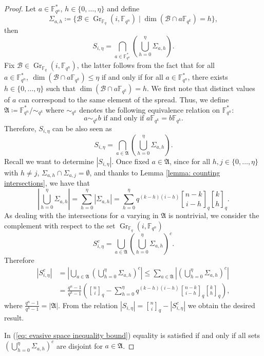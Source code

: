 \documentclass{article}
\newcommand{\Fq}{\mathbb{F}_{q}}
\newcommand{\Fqn}{\mathbb{F}_{q^n}}
\newcommand{\Fqk}{\mathbb{F}_{q^k}}
\newcommand{\calB}{\mathcal{B}}
\newcommand{\gbinom}[2]{\genfrac{[}{]}{0pt}{}{#1}{#2}}
\DeclareMathOperator{\Gr}{Gr}
\begin{document}
    \begin{proof}
        Let $a\in\Fqn^*$, $h\in\{0,\ldots,\eta\}$ and define 
    \[
    \Sigma_{a,h}\coloneqq \{\calB \in  \Gr_{\Fq}(i,\Fqn) \mid \dim(\calB \cap a \Fqk)=h\}, 
    \]
    then
    \[
    S_{i,\eta}=\bigcap_{a\in\Fqn^*}\left(\bigcup_{h=0}^\eta\Sigma_{a,h}\right).
    \]
    Fix $\calB \in  \Gr_{\Fq}(i,\Fqn)$, the latter follows from the fact that for all $a \in \Fqn^*,~\dim(\calB \cap a \Fqk) \leq \eta$ if and only if for all $a \in \Fqn^*$, there exists $h\in\{0,\ldots,\eta\}$ such that $\dim(\calB \cap a \Fqk)=h$. We first note that distinct values of $a$ can correspond to the same element of the spread. Thus, we define $\mathfrak{A}\coloneqq\Fqn^*/\sim_{q^k}$ where $\sim_{q^k}$ denotes the following equivalence relation on $\Fqn^*$: 
    \[
    a\sim_{q^k} b\text{ if and only if }a\Fqk=b\Fqk.
    \]
    Therefore, $S_{i,\eta}$ can be also seen as
    \[
    S_{i,\eta}=\bigcap_{a\in\mathfrak{A}}\left(\bigcup_{h=0}^\eta\Sigma_{a,h}\right).
    \]
    Recall we want to determine $|S_{i,\eta}|$. Once fixed $a\in\mathfrak{A}$, since for all $h,j\in\{0,\ldots,\eta\}$ with $h\neq j$, $\Sigma_{a,h}\cap\Sigma_{a,j}=\emptyset$, and thanks to Lemma \ref{lemma: counting intersections}, we have that
    \[
    \left\lvert\bigcup_{h=0}^\eta\Sigma_{a,h}\right\rvert=\sum_{h=0}^\eta\left\lvert\Sigma_{a,h}\right\rvert=\sum_{h=0}^\eta q^{(k-h)(i-h)}\gbinom{n-k}{i-h}_q\gbinom{k}{h}_q.
    \]
    As dealing with the intersections for $a$ varying in $\mathfrak{A}$ is nontrivial, we consider the complement with respect to the set $\Gr_{\Fq}(i,\Fqn)$
    \[
    S_{i,\eta}^c=\bigcup_{a\in\mathfrak{A}}\left(\bigcup_{h=0}^\eta\Sigma_{a,h}\right)^c.
    \]
    Therefore 
    \begin{equation}
    \label{eq: evasive space inequality bound}
        \begin{aligned}
            \left\lvert S_{i,\eta}^c\right\rvert&=\left\lvert \bigcup_{a\in\mathfrak{A}}\left(\bigcup_{h=0}^\eta\Sigma_{a,h}\right)^c\right\rvert\leq \sum_{a\in\mathfrak{A}} \left\lvert \left(\bigcup_{h=0}^\eta\Sigma_{a,h}\right)^c\right\rvert\\
            &=\frac{q^n-1}{q^k-1}\left(\gbinom{n}{i}_q-\sum_{h=0}^\eta q^{(k-h)(i-h)}\gbinom{n-k}{i-h}_q\gbinom{k}{h}_q\right),
        \end{aligned}
    \end{equation}
    where $\frac{q^n - 1}{q^k - 1} = |\mathfrak{A}|.$
    From the relation $|S_{i,\eta}| = \gbinom{n}{i}_q -  |S_{i,\eta}^c| $ we obtain the desired result.
    \par In (\ref{eq: evasive space inequality bound}) equality is satisfied if and only if all sets $\left(\bigcup_{h=0}^\eta\Sigma_{a,h}\right)^c$ are disjoint for $a \in \mathfrak{A}$.

\end{proof}
\end{document}

